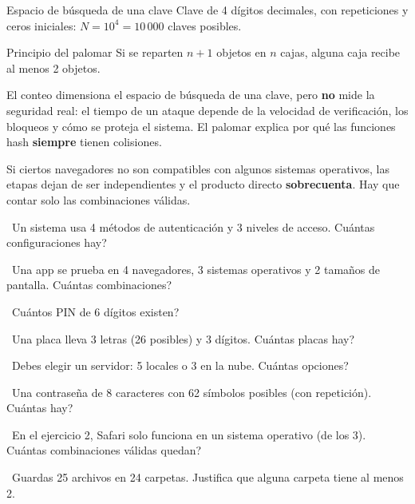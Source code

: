 \begin{tmejemplo}{Espacio de b\'usqueda de una clave}
Clave de 4 d\'igitos decimales, con repeticiones y ceros iniciales: $N=10^4=10\,000$ claves posibles.
\end{tmejemplo}

\begin{tmdef}{Principio del palomar}
Si se reparten $n+1$ objetos en $n$ cajas, alguna caja recibe al menos 2 objetos.
\end{tmdef}

\begin{tmsistemas}
El conteo dimensiona el espacio de b\'usqueda de una clave, pero \textbf{no} mide la seguridad real: el tiempo de un ataque depende de la velocidad de verificaci\'on, los bloqueos y c\'omo se proteja el sistema. El palomar explica por qu\'e las funciones hash \textbf{siempre} tienen colisiones.
\end{tmsistemas}

\begin{tmcuidado}Si ciertos navegadores no son compatibles con algunos sistemas operativos, las etapas dejan de ser independientes y el producto directo \textbf{sobrecuenta}. Hay que contar solo las combinaciones v\'alidas.\end{tmcuidado}

\begin{tmejercicios}
\label{ej:2-1}
\begin{tmlista}
\item \tmbasico\ Un sistema usa 4 m\'etodos de autenticaci\'on y 3 niveles de acceso. \textquestiondown Cu\'antas configuraciones hay?
\item \tmbasico\ Una app se prueba en 4 navegadores, 3 sistemas operativos y 2 tama\~nos de pantalla. \textquestiondown Cu\'antas combinaciones?
\item \tmbasico\ \textquestiondown Cu\'antos PIN de 6 d\'igitos existen?
\item \tmmedio\ Una placa lleva 3 letras (26 posibles) y 3 d\'igitos. \textquestiondown Cu\'antas placas hay?
\item \tmmedio\ Debes elegir un servidor: 5 locales o 3 en la nube. \textquestiondown Cu\'antas opciones?
\item \tmmedio\ Una contrase\~na de 8 caracteres con 62 s\'imbolos posibles (con repetici\'on). \textquestiondown Cu\'antas hay?
\item \tmdificil\ En el ejercicio 2, Safari solo funciona en un sistema operativo (de los 3). \textquestiondown Cu\'antas combinaciones v\'alidas quedan?
\item \tmdificil\ Guardas 25 archivos en 24 carpetas. Justifica que alguna carpeta tiene al menos 2.
\end{tmlista}
\end{tmejercicios}

